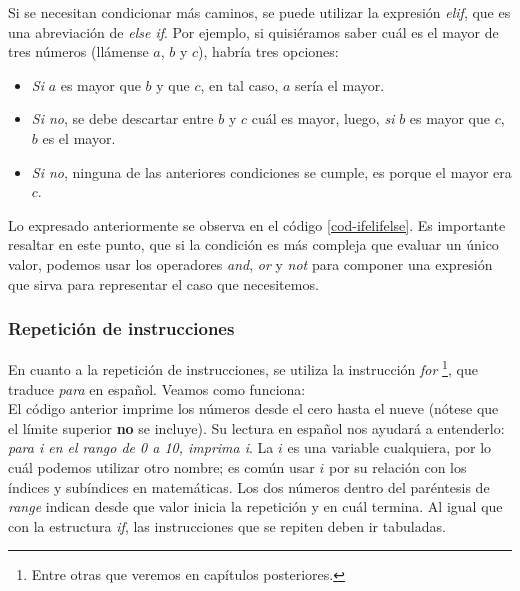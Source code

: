 

Si se necesitan condicionar más caminos, se puede utilizar la expresión \emph{elif}, que es una abreviación de \emph{else if}. Por ejemplo, si quisiéramos saber cuál es el mayor de tres números (llámense $a$, $b$ y $c$), habría tres opciones: 

\begin{itemize}
\item \emph{Si} $a$ es mayor que $b$ y que $c$, en tal caso, $a$ sería el mayor.

\item \emph{Si no}, se debe descartar entre $b$ y $c$ cuál es mayor, luego, \emph{si} $b$ es mayor que $c$, $b$ es el mayor.

\item \emph{Si no}, ninguna de las anteriores condiciones se cumple, es porque el mayor era $c$. 
\end{itemize}


Lo expresado anteriormente se observa en el código \ref{cod-ifelifelse}. Es importante resaltar en este punto, que si la condición es más compleja que evaluar un único valor, podemos usar los operadores \emph{and}, \emph{or} y \emph{not} para componer una expresión que sirva para representar el caso que necesitemos.   \\




\subsubsection{Repetición de instrucciones}

En cuanto a la repetición de instrucciones, se utiliza la instrucción \emph{for} \footnote{Entre otras que veremos en capítulos posteriores.}, que traduce \emph{para} en español. Veamos como funciona: \\



El código anterior imprime los números desde el cero hasta el nueve (nótese que el límite superior \textbf{no} se incluye). Su lectura en español nos ayudará a entenderlo: \emph{para i en el rango de 0 a 10, imprima i}. La $i$ es una variable cualquiera, por lo cuál podemos utilizar otro nombre; es común usar $i$ por su relación con los índices y subíndices en matemáticas. Los dos números dentro del paréntesis de \emph{range} indican desde que valor inicia la repetición y en cuál termina. Al igual que con la estructura \emph{if}, las instrucciones que se repiten deben ir tabuladas.


